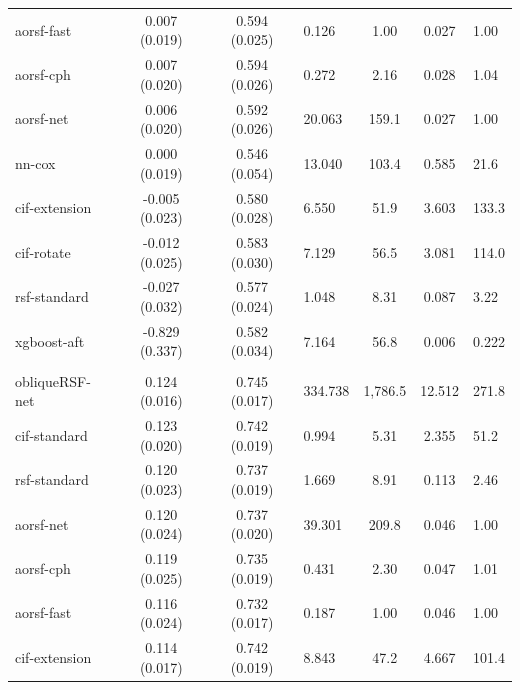 \documentclass[twoside,11pt]{article}\usepackage[]{graphicx}\usepackage[]{xcolor}
\newenvironment{knitrout}{}{} %
\begin{document}
\begin{knitrout}
\begin{longtable}{lcclccl}
\hspace{1em}aorsf-fast & 0.007 (0.019) & 0.594 (0.025) & 0.126 & 1.00 & 0.027 & 1.00\\
\hspace{1em}aorsf-cph & 0.007 (0.020) & 0.594 (0.026) & 0.272 & 2.16 & 0.028 & 1.04\\
\hspace{1em}aorsf-net & 0.006 (0.020) & 0.592 (0.026) & 20.063 & 159.1 & 0.027 & 1.00\\
\hspace{1em}nn-cox & 0.000 (0.019) & 0.546 (0.054) & 13.040 & 103.4 & 0.585 & 21.6\\
\hspace{1em}cif-extension & -0.005 (0.023) & 0.580 (0.028) & 6.550 & 51.9 & 3.603 & 133.3\\
\hspace{1em}cif-rotate & -0.012 (0.025) & 0.583 (0.030) & 7.129 & 56.5 & 3.081 & 114.0\\
\hspace{1em}rsf-standard & -0.027 (0.032) & 0.577 (0.024) & 1.048 & 8.31 & 0.087 & 3.22\\
\hspace{1em}xgboost-aft & -0.829 (0.337) & 0.582 (0.034) & 7.164 & 56.8 & 0.006 & 0.222\\
\addlinespace[0.3em]
\hline
\multicolumn{7}{l}{\textit{\textbf{GBSG II; recurrence or death, n = 686, p = 10}}}\\
\hline
\hspace{1em}obliqueRSF-net & 0.124 (0.016) & 0.745 (0.017) & 334.738 & 1,786.5 & 12.512 & 271.8\\
\hspace{1em}cif-standard & 0.123 (0.020) & 0.742 (0.019) & 0.994 & 5.31 & 2.355 & 51.2\\
\hspace{1em}rsf-standard & 0.120 (0.023) & 0.737 (0.019) & 1.669 & 8.91 & 0.113 & 2.46\\
\hspace{1em}aorsf-net & 0.120 (0.024) & 0.737 (0.020) & 39.301 & 209.8 & 0.046 & 1.00\\
\hspace{1em}aorsf-cph & 0.119 (0.025) & 0.735 (0.019) & 0.431 & 2.30 & 0.047 & 1.01\\
\hspace{1em}aorsf-fast & 0.116 (0.024) & 0.732 (0.017) & 0.187 & 1.00 & 0.046 & 1.00\\
\hspace{1em}cif-extension & 0.114 (0.017) & 0.742 (0.019) & 8.843 & 47.2 & 4.667 & 101.4\\

\end{longtable}
\end{knitrout}
\end{document}
